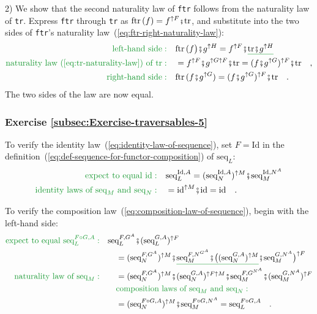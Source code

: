 2) We show that the second naturality law of \lstinline!ftr! follows
from the naturality law of \lstinline!tr!. Express \lstinline!ftr!
through \lstinline!tr! as $\text{ftr}\,(f)=f^{\uparrow F}\bef\text{tr}$,
and substitute into the two sides of \lstinline!ftr!\textsf{'}s naturality
law~(\ref{eq:ftr-right-naturality-law}): 
\begin{align*}
{\color{greenunder}\text{left-hand side}:}\quad & \text{ftr}\,(f\big)\bef g^{\uparrow H}=f^{\uparrow F}\bef\gunderline{\text{tr}\bef g^{\uparrow H}}\\
{\color{greenunder}\text{naturality law~(\ref{eq:tr-naturality-law}) of }\text{tr}:}\quad & =f^{\uparrow F}\bef g^{\uparrow G\uparrow F}\bef\text{tr}=(f\bef g^{\uparrow G})^{\uparrow F}\bef\text{tr}\quad,\\
{\color{greenunder}\text{right-hand side}:}\quad & \text{ftr}\,(f\bef g^{\uparrow G})=(f\bef g^{\uparrow G})^{\uparrow F}\bef\text{tr}\quad.
\end{align*}
The two sides of the law are now equal.

\subsubsection*{Exercise \ref{subsec:Exercise-traversables-5}}

To verify the identity law~(\ref{eq:identity-law-of-sequence}),
set $F=\text{Id}$ in the definition~(\ref{eq:def-sequence-for-functor-composition})
of $\text{seq}_{L}$:
\begin{align*}
{\color{greenunder}\text{expect to equal }\text{id}:}\quad & \text{seq}_{L}^{\text{Id},A}=(\text{seq}_{N}^{\text{Id},A})^{\uparrow M}\bef\text{seq}_{M}^{\text{Id},N^{A}}\\
{\color{greenunder}\text{identity laws of }\text{seq}_{M}\text{ and }\text{seq}_{N}:}\quad & =\text{id}^{\uparrow M}\bef\text{id}=\text{id}\quad.
\end{align*}

To verify the composition law~(\ref{eq:composition-law-of-sequence}),
begin with the left-hand side:
\begin{align*}
{\color{greenunder}\text{expect to equal }\text{seq}_{L}^{F\circ G,A}:}\quad & \text{seq}_{L}^{F,G^{A}}\bef(\text{seq}_{L}^{G,A})^{\uparrow F}\\
 & \quad=(\text{seq}_{N}^{F,G^{A}})^{\uparrow M}\bef\gunderline{\text{seq}_{M}^{F,N^{G^{A}}}\bef\big((\text{seq}_{N}^{G,A})^{\uparrow M}}\bef\text{seq}_{M}^{G,N^{A}}\big)^{\uparrow F}\\
{\color{greenunder}\text{naturality law of }\text{seq}_{M}:}\quad & \quad=(\text{seq}_{N}^{F,G^{A}})^{\uparrow M}\bef(\text{seq}_{N}^{G,A})^{\uparrow F\uparrow M}\bef\text{seq}_{M}^{F,G^{N^{A}}}\bef(\text{seq}_{M}^{G,N^{A}})^{\uparrow F}\\
 & \quad{\color{greenunder}\text{composition laws of }\text{seq}_{M}\text{ and }\text{seq}_{N}:}\quad\\
 & \quad=(\text{seq}_{N}^{F\circ G,A})^{\uparrow M}\bef\text{seq}_{M}^{F\circ G,N^{A}}=\text{seq}_{L}^{F\circ G,A}\quad.
\end{align*}


